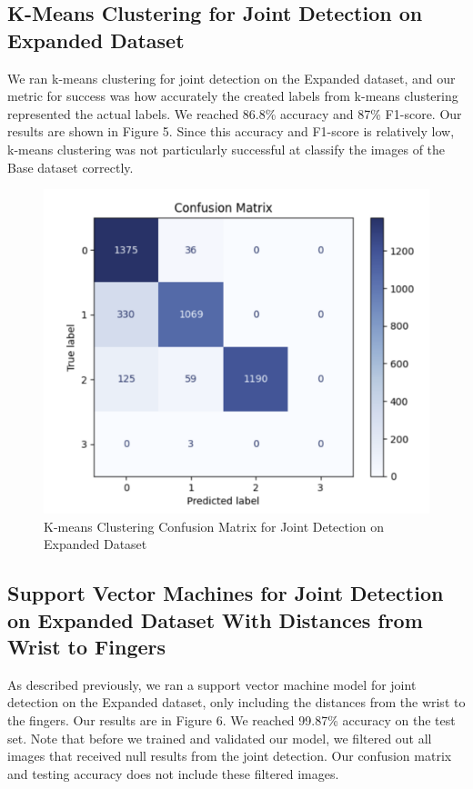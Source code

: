 \documentclass{article}
\begin{document}
\subsection{K-Means Clustering for Joint Detection on Expanded Dataset}
We ran k-means clustering for joint detection on the Expanded dataset, and our metric for success was how accurately the created labels from k-means clustering represented the actual labels. We reached 86.8\% accuracy and 87\% F1-score. Our results are shown in Figure 5. Since this accuracy and F1-score is relatively low, k-means clustering was not particularly successful at classify the images of the Base dataset correctly.

\begin{figure}[h]
\begin{center}
\centerline{\includegraphics[width=\columnwidth]{kmeans_ex_joint.png}}
\caption{K-means Clustering Confusion Matrix for Joint Detection on Expanded Dataset}
\end{center}
\end{figure}

\subsection{Support Vector Machines for Joint Detection on Expanded Dataset With Distances from Wrist to Fingers}
As described previously, we ran a support vector machine model for joint detection on the Expanded dataset, only including the distances from the wrist to the fingers. Our results are in Figure 6. We reached 99.87\% accuracy on the test set. Note that before we trained and validated our model, we filtered out all images that received null results from the joint detection. Our confusion matrix and testing accuracy does not include these filtered images.
\end{document}

